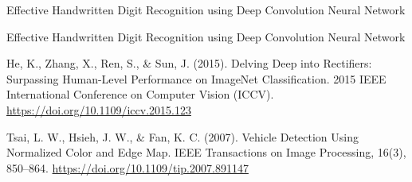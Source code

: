 \documentclass[letterpaper, 10 pt, conference]{ieeeconf}  %
\begin{document}
\begin{thebibliography}{99}
 Effective Handwritten Digit Recognition using Deep Convolution
Neural Network

 Effective Handwritten Digit Recognition using Deep Convolution
Neural Network

 He, K., Zhang, X., Ren, S., \& Sun, J. (2015). Delving Deep into Rectifiers: Surpassing Human-Level Performance on ImageNet Classification. 2015 IEEE International Conference on Computer Vision (ICCV). \url{https://doi.org/10.1109/iccv.2015.123}

 Tsai, L. W., Hsieh, J. W., \& Fan, K. C. (2007). Vehicle Detection Using Normalized Color and Edge Map. IEEE Transactions on Image Processing, 16(3), 850–864. \url{https://doi.org/10.1109/tip.2007.891147}

\end{thebibliography}
\end{document}
